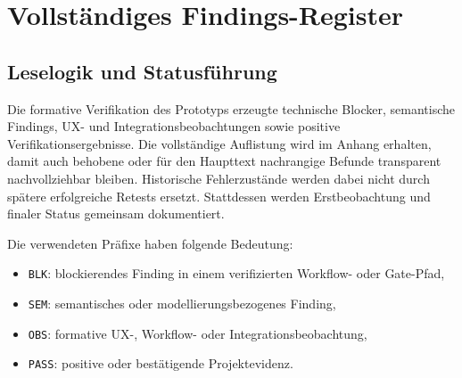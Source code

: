 %
%
%
%

\section{Vollständiges Findings-Register}
\label{app:findings_register}

\subsection{Leselogik und Statusführung}

Die formative Verifikation des Prototyps erzeugte technische Blocker, semantische
Findings, UX- und Integrationsbeobachtungen sowie positive Verifikationsergebnisse.
Die vollständige Auflistung wird im Anhang erhalten, damit auch behobene oder für
den Haupttext nachrangige Befunde transparent nachvollziehbar bleiben. Historische
Fehlerzustände werden dabei nicht durch spätere erfolgreiche Retests ersetzt.
Stattdessen werden Erstbeobachtung und finaler Status gemeinsam dokumentiert.

Die verwendeten Präfixe haben folgende Bedeutung:

\begin{itemize}
    \item \texttt{BLK}: blockierendes Finding in einem verifizierten Workflow- oder Gate-Pfad,
    \item \texttt{SEM}: semantisches oder modellierungsbezogenes Finding,
    \item \texttt{OBS}: formative UX-, Workflow- oder Integrationsbeobachtung,
    \item \texttt{PASS}: positive oder bestätigende Projektevidenz.
\end{itemize}

